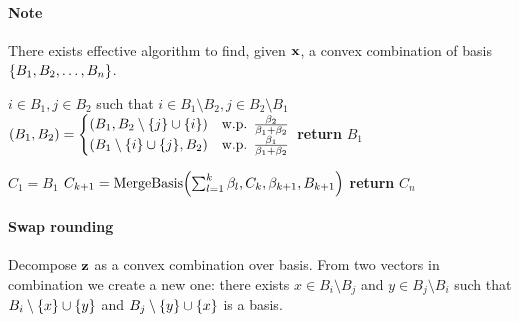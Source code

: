 \paragraph{Note} There exists effective algorithm to find, given $\vb{x}$, a convex combination of basis $\qty{B_1, B_2, \dots, B_n}$.



\begin{algorithm}
	\caption{}\label{alg:merge_basis}
	\begin{algorithmic}[1]
		\State $i\in B_1, j\in B_2$ such that $i \in B_1\setminus B_2, j\in B_2\setminus B_1$
		\State $\qty(B_1, B_2) = \begin{cases}
		\qty(B_1, B_2\setminus \qty{j} \cup \qty{i})& \text{w.p. } \frac{\beta_2}{\beta_1+\beta_2}\\
		\qty(B_1\setminus \qty{i} \cup \qty{j}, B_2)& \text{w.p. } \frac{\beta_1}{\beta_1+\beta_2}\\
		\end{cases}$
		\EndWhile
		\State \textbf{return} $B_1$
		\EndProcedure
	\end{algorithmic}
\end{algorithm}


\begin{algorithm}
	\caption{}\label{alg:swap_rounding}
	\begin{algorithmic}[1]
		\State $C_1=B_1$
		\State $C_{k+1} = \mathrm{Merge Basis}\qty(\sum_{l =1}^k \beta_l, C_k, \beta_{k+1}, B_{k+1})$
		\EndFor
		\State \textbf{return} $C_n$
		\EndProcedure
	\end{algorithmic}
\end{algorithm}

\paragraph{Swap rounding}
Decompose $\vb{z}$ as a convex combination over basis. From two vectors in combination we create a new one: there exists $x\in B_i \setminus B_j$ and $y\in B_j \setminus B_i$ such that $B_i \setminus \qty{x} \cup \qty{y}$ and $B_j \setminus \qty{y} \cup \qty{x}$ is a basis.

